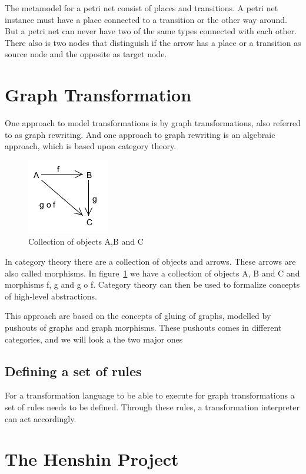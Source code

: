 \documentclass[pdftex,11pt,a4paper]{article}
\begin{document}
The metamodel for a petri net consist of places and transitions. A petri net
instance must have a place connected to a transition or the other way around.
But a petri net can never have two of the same types connected with each other.
There also is two nodes that distinguish if the arrow has a place or a
transition as source node and the opposite as target node.

\section{Graph Transformation}
One approach to model transformations is by graph transformations, also referred
to as graph rewriting. And one approach to graph rewriting is an algebraic
approach, which is based upon category theory\cite{Barr1990}.

\begin{figure}[H]
	\centering
	\includegraphics[scale=0.7]{figures/categoryTheory.png}
	\caption{Collection of objects A,B and C}
	\label{fig:categoryTheory}
\end{figure}

In category theory there are a collection of objects and arrows. These arrows
are also called morphisms. In figure~\ref{fig:categoryTheory} we have a
collection of objects A, B and C and morphisms f, g and g o f. Category
theory can then be used to formalize concepts of high-level abstractions. 

This approach are based on the concepts of gluing of graphs, modelled by
pushouts of graphs and graph morphisms. These pushouts comes in different
categories, and we will look a the two major ones

\subsection{Defining a set of rules}
For a transformation language to be able to execute for graph transformations a
set of rules needs to be defined. Through these rules, a transformation
interpreter can act accordingly.

\section{The Henshin Project}
\end{document}
